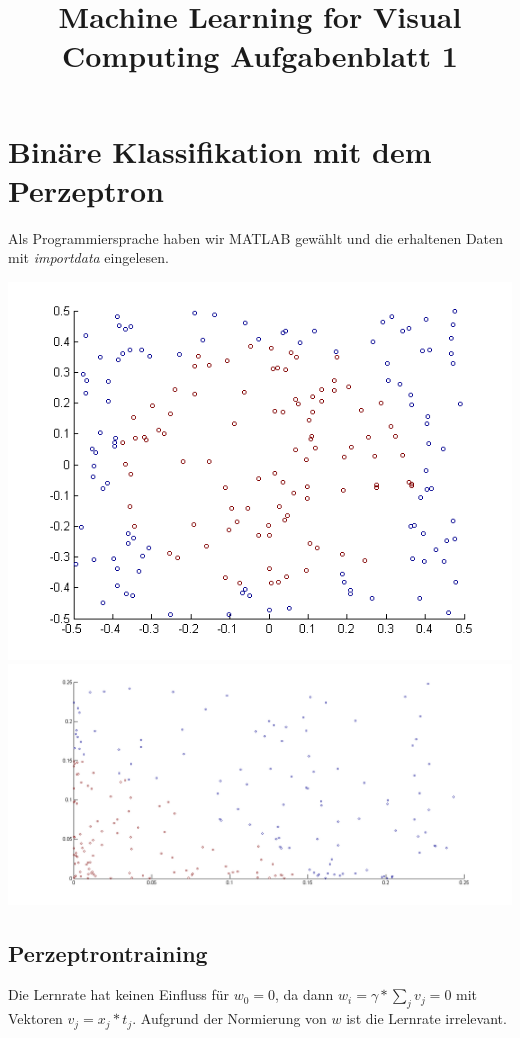 \documentclass[]{report}
\title{Machine Learning for Visual Computing \linebreak
		Aufgabenblatt 1}
\author{}
\begin{document}
\maketitle
\section*{Binäre Klassifikation mit dem Perzeptron}
Als Programmiersprache haben wir MATLAB gewählt und die erhaltenen Daten mit \textit{importdata} eingelesen.
\newline
\begin{minipage}[c]{\linewidth}
	\centering
	\includegraphics[scale=0.75]{perzeptron5.png}
	\includegraphics[scale=0.35]{perzsurprise.png}
\end{minipage}
\newline

\subsection*{Perzeptrontraining}

Die Lernrate hat keinen Einfluss für $w_0=0$, da dann $w_i=\gamma * \sum_j{v_j}=0$ mit Vektoren $v_j=x_j * t_j$. Aufgrund der Normierung von $w$ ist die Lernrate irrelevant.
\end{document}

